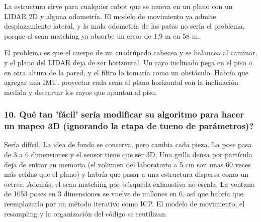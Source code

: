 La estructura sirve para cualquier robot que se mueva en un plano con un LIDAR
2D y alguna odometría. El modelo de movimiento ya admite desplazamiento
lateral, y la mala odometría de las patas no sería el problema, porque el scan
matching ya absorbe un error de 1,9 m en 58 m.

El problema es que el cuerpo de un cuadrúpedo cabecea y se balancea al caminar,
y el plano del LIDAR deja de ser horizontal. Un rayo inclinado pega en el piso
o en otra altura de la pared, y el filtro lo tomaría como un obstáculo. Habría
que agregar una IMU, proyectar cada scan al plano horizontal con la inclinación
medida y descartar los rayos que apuntan al piso.

\subsubsection*{10. \textquestiondown{}Qué tan 'fácil' sería modificar su algoritmo para hacer un mapeo 3D (ignorando la etapa de tueno de parámetros)?}

Sería difícil. La idea de fondo se conserva, pero cambia cada pieza. La pose
pasa de 3 a 6 dimensiones y el sensor tiene que ser 3D. Una grilla densa por
partícula deja de entrar en memoria (el volumen del laboratorio a 5 cm son unas
60 veces más celdas que el plano) y habría que pasar a una estructura dispersa
como un octree. Además, el scan matching por búsqueda exhaustiva no escala. La
ventana de 1053 poses en 3 dimensiones se vuelve de millones en 6, así que
habría que reemplazarlo por un método iterativo como ICP. El modelo de
movimiento, el resampling y la organización del código se reutilizan.

\FloatBarrier
